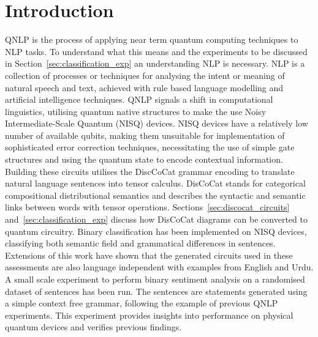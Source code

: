 \documentclass[a4paper,twocolumn,11pt]{quantumarticle}
\begin{document}
    \section{Introduction}\label{sec:introduction}
    QNLP is the process of applying near term quantum computing techniques to NLP tasks\cite{qnlp_near_term}.
    To understand what this means and the experiments to be discussed in Section~\ref{sec:classification_exp} an understanding
    NLP is necessary.
    NLP is a collection of processes or techniques for analysing the intent or meaning of natural speech and text\cite{nlp},
    achieved with rule based language modelling and artificial intelligence techniques\cite{nlp}.
    \newline
    QNLP signals a shift in computational linguistics, utilising quantum native structures to make the use Noisy
    Intermediate-Scale Quantum (NISQ) devices\cite{qnlp_in_prac}.
    NISQ devices have a relatively low number of available qubits, making them unsuitable for implementation of
    sophisticated error correction techniques, necessitating the use of simple gate structures and using
    the quantum state to encode contextual information\cite{qubits_speak,qnlp_in_prac}.
    \newline
    Building these circuits utilises the DiscCoCat\cite{discocat, qnlp_near_term} grammar
    encoding to translate natural language sentences into tensor calculus.
    DisCoCat stands for categorical compositional distributional semantics\cite{discocat} and describes the syntactic
    and semantic links between words with tensor operations\cite{discocat}.
    Sections~\ref{sec:discocat_circuits} and~\ref{sec:classification_exp} discuss how DisCoCat diagrams can be converted
    to quantum circuitry.
    \newline
    Binary classification has been implemented on NISQ devices\cite{qnlp_in_prac}, classifying both semantic field and
    grammatical differences in sentences\cite{qnlp_in_prac}.
    Extensions of this work have shown that the generated circuits used in these assessments are also language independent\cite{lang_indp}
    with examples from English and Urdu\cite{lang_indp}.
    \newline
    A small scale experiment to perform binary sentiment analysis on a randomised dataset of sentences has been run.
    The sentences are statements generated using a simple context free grammar, following the example of previous QNLP
    experiments\cite{qnlp_in_prac, lang_indp}.
    This experiment provides insights into performance on physical quantum devices and verifies previous findings.
\end{document}
